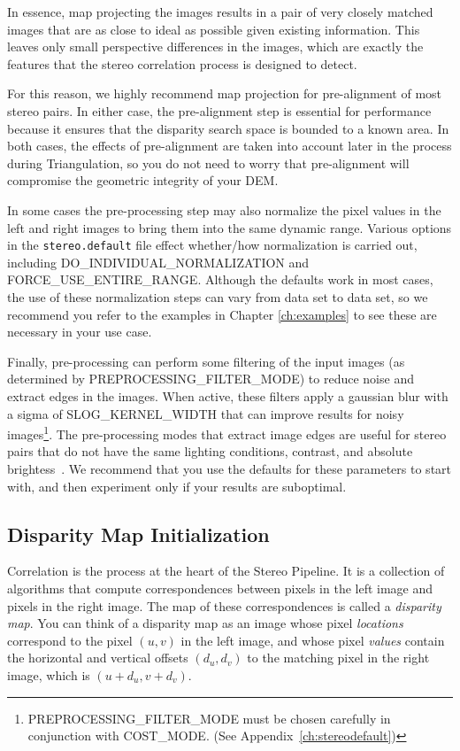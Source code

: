 In essence, map projecting the images results in a pair of very
closely matched images that are as close to ideal as possible given
existing information.  This leaves only small perspective differences
in the images, which are exactly the features that the stereo
correlation process is designed to detect.  

For this reason, we highly recommend map projection for pre-alignment
of most stereo pairs.  In either case, the pre-alignment step is
essential for performance because it ensures that the disparity search
space is bounded to a known area.  In both cases, the effects of
pre-alignment are taken into account later in the process during
Triangulation, so you do not need to worry that pre-alignment will
compromise the geometric integrity of your DEM.

In some cases the pre-processing step may also normalize the pixel
values in the left and right images to bring them into the same
dynamic range.  Various options in the {\tt stereo.default} file
effect whether/how normalization is carried out, including
DO\_INDIVIDUAL\_NORMALIZATION and FORCE\_USE\_ENTIRE\_RANGE.  Although
the defaults work in most cases, the use of these normalization steps
can vary from data set to data set, so we recommend you refer to the
examples in Chapter \ref{ch:examples} to see these are necessary in
your use case.

Finally, pre-processing can perform some filtering of the input images
(as determined by PREPROCESSING\_FILTER\_MODE) to reduce noise and
extract edges in the images.  When active, these filters apply a
gaussian blur with a sigma of SLOG\_KERNEL\_WIDTH that can improve
results for noisy images\footnote{PREPROCESSING\_FILTER\_MODE must be
  chosen carefully in conjunction with COST\_MODE.  (See
  Appendix~\ref{ch:stereodefault})}.  The pre-processing modes that
extract image edges are useful for stereo pairs that do not have the
same lighting conditions, contrast, and absolute
brightess~\cite{Nishihara84practical}.  We recommend that you use the
defaults for these parameters to start with, and then experiment only
if your results are suboptimal.

\subsection{Disparity Map Initialization}

Correlation is the process at the heart of the Stereo Pipeline.  It is
a collection of algorithms that compute correspondences between pixels
in the left image and pixels in the right image.  The map of these
correspondences is called a {\em disparity map}.  You can think of a
disparity map as an image whose pixel {\em locations} correspond to
the pixel $(u,v)$ in the left image, and whose pixel {\em values}
contain the horizontal and vertical offsets $(d_u, d_v)$ to the
matching pixel in the right image, which is $(u+d_u, v+d_v)$.  

